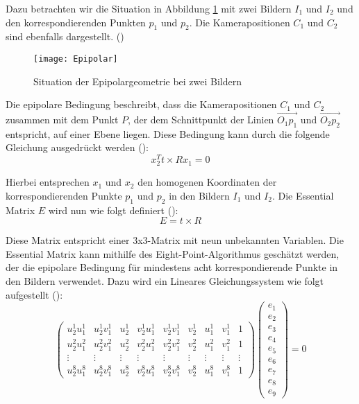 Dazu betrachten wir die Situation in Abbildung \ref{fig:Epipolar} mit zwei Bildern \( I_1 \) und \( I_2 \) und den korrespondierenden Punkten \( p_1 \) und \( p_2 \). Die Kamerapositionen \( C_1 \) und \( C_2 \) sind ebenfalls dargestellt. (\cite{gao2021vSLAM})

\begin{figure}
    \centering
    \texttt{[image: Epipolar]}
    \caption{Situation der Epipolargeometrie bei zwei Bildern\label{fig:Epipolar}}\par
\end{figure}

Die epipolare Bedingung beschreibt, dass die Kamerapositionen \( C_1 \) und \( C_2 \) zusammen mit dem Punkt \( P \), der dem Schnittpunkt der Linien \( \overrightarrow{O_1p_1} \) und \( \overrightarrow{O_2p_2} \) entspricht, auf einer Ebene liegen. Diese Bedingung kann durch die folgende Gleichung ausgedrückt werden (\cite{gao2021vSLAM}):
\begin{equation}
    x_2^T t \times R x_1 = 0
\end{equation}

Hierbei entsprechen \( x_1 \) und \( x_2 \) den homogenen Koordinaten der korrespondierenden Punkte \( p_1 \) und \( p_2 \) in den Bildern \( I_1 \) und \( I_2 \). Die Essential Matrix \( E \) wird nun wie folgt definiert (\cite{gao2021vSLAM}):
\begin{equation}
    E = t \times R
\end{equation}

Diese Matrix entspricht einer 3x3-Matrix mit neun unbekannten Variablen. Die Essential Matrix kann mithilfe des Eight-Point-Algorithmus geschätzt werden, der die epipolare Bedingung für mindestens acht korrespondierende Punkte in den Bildern verwendet. Dazu wird ein Lineares Gleichungssystem wie folgt aufgestellt (\cite{gao2021vSLAM, stachniss2020FandEmatrix}): 
\begin{equation}
    \begin{pmatrix}
        u_2^1 u_1^1 & u_2^1 v_1^1 & u_2^1 & v_2^1 u_1^1 & v_2^1 v_1^1 & v_2^1 & u_1^1 & v_1^1 & 1 \\
        u_2^2 u_1^2 & u_2^2 v_1^2 & u_2^2 & v_2^2 u_1^2 & v_2^2 v_1^2 & v_2^2 & u_1^2 & v_1^2 & 1 \\
        \vdots & \vdots & \vdots & \vdots & \vdots & \vdots & \vdots & \vdots & \vdots \\
        u_2^8 u_1^8 & u_2^8 v_1^8 & u_2^8 & v_2^8 u_1^8 & v_2^8 v_1^8 & v_2^8 & u_1^8 & v_1^8 & 1 
    \end{pmatrix}
    \begin{pmatrix}
        e_1 \\ e_2 \\ e_3 \\ e_4 \\ e_5 \\ e_6 \\ e_7 \\ e_8 \\ e_9
    \end{pmatrix}
    = 0
\end{equation}

